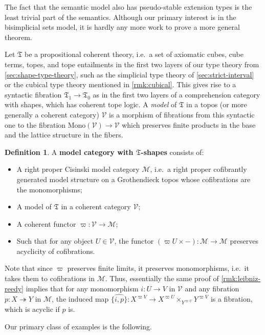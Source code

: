 \documentclass[12pt]{amsart}
\theoremstyle{plain}
\theoremstyle{definition}
\newtheorem{defn}[thm]{Definition}
\theoremstyle{remark}
\numberwithin{equation}{section}
\newcommand{\M}{\mathcal{M}}
\newcommand{\V}{\mathcal{V}}
\newcommand{\fT}{\mathfrak{T}}
\begin{document}
The fact that the semantic model also has pseudo-stable extension types is the least trivial part of the semantics.
Although our primary interest is in the bisimplicial sets model, it is hardly any more work to prove a more general theorem.

Let $\fT$ be a propositional coherent theory, i.e.\ a set of axiomatic cubes, cube terms, topes, and tope entailments in the first two layers of our type theory from \cref{sec:shape-type-theory}, such as the simplicial type theory of \cref{sec:strict-interval} or the cubical type theory mentioned in \cref{rmk:cubical}.
This gives rise to a syntactic fibration $\fT_1 \to \fT_0$ as in the first two layers of a comprehension category with shapes, which has coherent tope logic.
A \emph{model} of $\fT$ in a topos (or more generally a coherent category) $\V$ is a morphism of fibrations from this syntactic one to the fibration $\mathrm{Mono}(\V) \to \V$ which preserves finite products in the base and the lattice structure in the fibers.

\begin{defn}\label{defn:model-shapes}
  A \textbf{model category with $\fT$-shapes} consists of:
  \begin{itemize}
  \item A right proper Cisinski model category $\M$, i.e.\ a right proper cofibrantly generated model structure on a Grothendieck topos whose cofibrations are the monomorphisms;
  \item A model of $\fT$ in a coherent category $\V$;
  \item A  coherent functor $\varpi : \V\to\M$;
  \item Such that for any object $U\in \V$, the functor $(\varpi U \times -):\M\to\M$ preserves acyclicity of cofibrations.
  \end{itemize}
\end{defn}

Note that since $\varpi$ preserves finite limits, it preserves monomorphisms, i.e.\ it takes them to cofibrations in $\M$.
Thus, essentially the same proof of \cref{rmk:leibniz-reedy} implies that for any monomorphism $i:U\to V$ in $\V$ and any fibration $p:X\twoheadrightarrow Y$ in $\M$, the induced map $\widehat{\{i,p\}} \colon X^{\varpi V} \to X^{\varpi U} \times_{Y^{\varpi U}} Y^{\varpi V}$ is a fibration, which is acyclic if $p$ is.

Our primary class of examples is the following.
\end{document}
